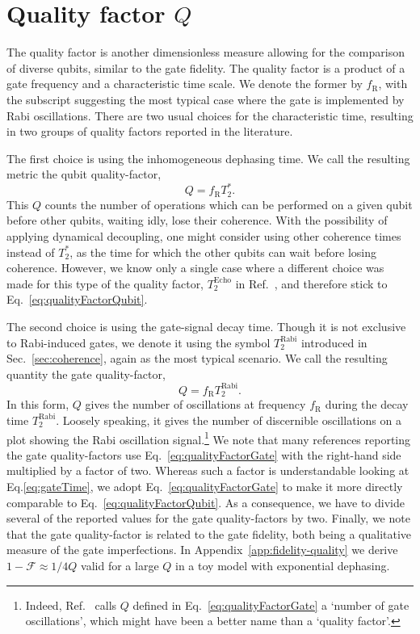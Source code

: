 \documentclass[aps, prx, showpacs, twocolumn, superscriptaddress, notitlepage, longbibliography, floatfix, nofootinbib]{revtex4-2}
\newcommand{\TRabi}{T_2^\mathrm{Rabi}}
\newcommand{\TEcho}{T_2^\mathrm{Echo}}
\begin{document}
\section{Quality factor $Q$}

\label{sec:qualityFactor}

The quality factor is another dimensionless measure allowing for the comparison of diverse qubits, similar to the gate fidelity. The quality factor is a product of a gate frequency and a characteristic time scale. We denote the former by $f_\mathrm{R}$, with the subscript suggesting the most typical case where the gate is implemented by Rabi oscillations. There are two usual choices for the characteristic time, resulting in two groups of quality factors reported in the literature. 

The first choice is using the inhomogeneous dephasing time. We call the resulting metric the qubit quality-factor,
\begin{equation}
Q = f_\mathrm{R} T_2^*.
\label{eq:qualityFactorQubit}
\end{equation}
This $Q$ counts the number of operations which can be performed on a given qubit before other qubits, waiting idly, lose their coherence. With the possibility of applying dynamical decoupling, one might consider using other coherence times instead of $T_2^*$, as the time for which the other qubits can wait before losing coherence. However, we know only a single case where a different choice was made for this type of the quality factor, $ \TEcho$ in Ref.~\cite{dial_charge_2013}, and therefore stick to Eq.~\eqref{eq:qualityFactorQubit}. 

The second choice is using the gate-signal decay time. Though it is not exclusive to Rabi-induced gates, we denote it using the symbol $ \TRabi$ introduced in Sec.~\ref{sec:coherence}, again as the most typical scenario. We call the resulting quantity the gate quality-factor,
\begin{equation}
Q = f_\mathrm{R}  \TRabi.
\label{eq:qualityFactorGate}
\end{equation}
In this form, $Q$ gives the number of oscillations at frequency $f_\mathrm{R}$ during the decay time $ \TRabi$. Loosely speaking, it gives the number of discernible oscillations on a plot showing the Rabi oscillation signal.\footnote{Indeed, Ref.~\cite{veldhorst_two-qubit_2015} calls $Q$ defined in Eq.~\eqref{eq:qualityFactorGate} a `number of gate oscillations', which might have been a better name than a `quality factor'.} We note that many references reporting the gate quality-factors use Eq.~\eqref{eq:qualityFactorGate} with the right-hand side multiplied by a factor of two. Whereas such a factor is understandable looking at Eq.\eqref{eq:gateTime}, we adopt Eq.~\eqref{eq:qualityFactorGate} to make it more directly comparable to Eq.~\ref{eq:qualityFactorQubit}. As a consequence, we have to divide several of the reported values for the gate quality-factors by two. Finally, we note that the gate quality-factor is related to the gate fidelity, both being a qualitative measure of the gate imperfections. In Appendix~\ref{app:fidelity-quality} we derive $1-\mathcal{F} \approx 1/4Q$ valid for a large $Q$ in a toy model with exponential dephasing.
\end{document}

